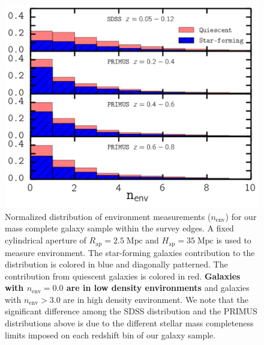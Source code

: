 \documentclass{emulateapj}
\def \apradius{2.5}
\def \apheight{35}
\begin{document}
\begin{figure}
  \begin{center}
    \leavevmode
    \includegraphics[scale=0.48]{fig2.pdf}
    \caption{Normalized distribution of environment measurements ($n_{\mathrm{env}}$) for our mass complete galaxy sample within the survey edges. A fixed cylindrical aperture of $R_{\mathrm{ap}} =\apradius\;\mathrm{Mpc}$ and $H_{\mathrm{ap}} = \apheight\; \mathrm{Mpc}$ is used to measure environment. The star-forming galaxies contribution to the distribution is colored in blue and diagonally patterned. The contribution from quiescent galaxies is colored in red. {\bf Galaxies with $n_{\mathrm{env}} = 0.0$ are in low density environments} and galaxies with $n_{\mathrm{env}} > 3.0$ are in high density environment. We note that the significant difference among the SDSS distribution and the PRIMUS distributions above is due to the different stellar mass completeness limits imposed on each redshift bin of our galaxy sample.}      \label{fig:envcount}
    \end{center}
\end{figure}
\end{document}
